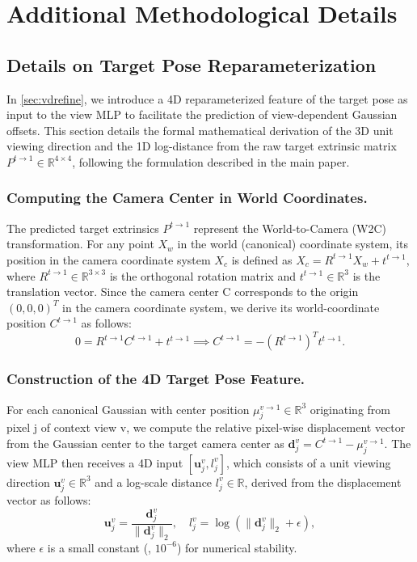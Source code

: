 \section{Additional Methodological Details}
\subsection{Details on Target Pose Reparameterization}
\label{sec:target_pose}
In \cref{sec:vdrefine}, we introduce a 4D reparameterized feature of the target pose as input to the view MLP to facilitate the prediction of view-dependent Gaussian offsets. This section details the formal mathematical derivation of the 3D unit viewing direction and the 1D log-distance from the raw target extrinsic matrix $P^{t \to 1} \in \mathbb{R}^{4 \times 4}$, following the formulation described in the main paper.

\subsubsection{Computing the Camera Center in World Coordinates.}
The predicted target extrinsics $P^{t \to 1}$ represent the World-to-Camera (W2C) transformation. For any point $X_w$ in the world (canonical) coordinate system, its position in the camera coordinate system $X_c$ is defined as $X_c = R^{t \to 1}X_w + t^{t \to 1}$, where $R^{t \to 1} \in \mathbb{R}^{3 \times 3}$ is the orthogonal rotation matrix and $t^{t \to 1} \in \mathbb{R}^3$ is the translation vector. Since the camera center C corresponds to the origin $(0, 0, 0)^T$ in the camera coordinate system, we derive its world-coordinate position $C^{t \to 1}$ as follows:
\begin{equation}
    0 = R^{t \to 1}C^{t \to 1} + t^{t \to 1} \implies C^{t \to 1} = -(R^{t \to 1})^Tt^{t \to 1}.
\end{equation}

\subsubsection{Construction of the 4D Target Pose Feature.}
For each canonical Gaussian with center position $\mu^{v \to 1}_j \in \mathbb{R}^3$ originating from pixel j of context view v, we compute the relative pixel-wise displacement vector from the Gaussian center to the target camera center as $\mathbf{d}^v_j = C^{t \to 1} - \mu^{v \to 1}_j$. The view MLP then receives a 4D input $[\mathbf{u}^v_j, l^v_j]$, which consists of a unit viewing direction $\mathbf{u}^v_j \in \mathbb{R}^3$ and a log-scale distance $l^v_j \in \mathbb{R}$, derived from the displacement vector as follows:
\begin{equation}
    \mathbf{u}^v_j = \frac{\mathbf{d}^v_j}{\|\mathbf{d}^v_j\|_2}, \quad l^v_j = \log(\|\mathbf{d}^v_j\|_2 + \epsilon),
    \label{eq:4d_targetpose}
\end{equation}
where $\epsilon$ is a small constant (\eg, $10^{-6}$) for numerical stability.

